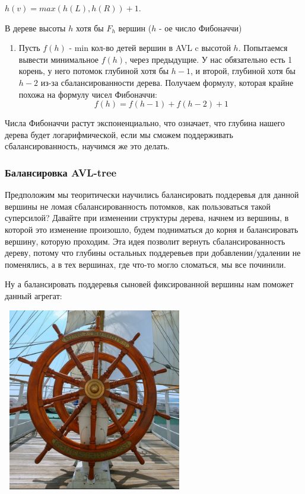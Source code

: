 $h(v) = max(h(L),h(R)) + 1 $.

 В дереве высоты $h$ хотя бы $F_h$ вершин ($h$ - ое число Фибоначчи)

\begin{enumerate}
    \item []  Пусть $f(h)$ - min кол-во детей вершин в AVL c высотой $h$. Попытаемся вывести минимальное $f(h)$, через предыдущие. У нас обязательно есть 1 корень, у него потомок глубиной хотя бы $h-1$, и второй, глубиной хотя бы $h-2$ из-за сбалансированности дерева. Получаем формулу, которая крайне похожа на формулу чисел Фибоначчи:
    $$f(h) = f(h-1) + f(h-2) + 1$$
\end{enumerate}

Числа Фибоначчи растут экспоненциально, что означает, что глубина нашего дерева будет логарифмической, если мы сможем поддерживать сбалансированность, научимся же это делать.

\subsubsection{Балансировка AVL-tree}
Предположим мы теоритически научились балансировать поддеревья для данной вершины не ломая сбалансированность потомков, как пользоваться такой суперсилой? Давайте при изменении структуры дерева, начнем из вершины, в которой это изменение произошло, будем подниматься до корня и балансировать вершину, которую проходим. Эта идея позволит вернуть сбалансированность дереву, потому что глубины остальных поддеревьев при добавлении/удалении не поменялись, а в тех вершинах, где что-то могло сломаться, мы все починили.

Ну а балансировать поддеревья сыновей фиксированной вершины нам поможет данный агрегат:
\begin{center}
   \includegraphics[width=8cm, height=8cm]{assets/wheel.jpg}
\end{center}

